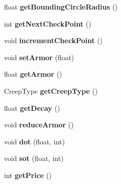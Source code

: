 \begin{DoxyCompactItemize}
\item 
\hypertarget{class_creep_a99980c4de512f87c8c23d8d191e04fba}{float {\bfseries get\+Bounding\+Circle\+Radius} ()}\label{class_creep_a99980c4de512f87c8c23d8d191e04fba}

\item 
\hypertarget{class_creep_a939ad94e5db0d29d415016140f979d1e}{int {\bfseries get\+Next\+Check\+Point} ()}\label{class_creep_a939ad94e5db0d29d415016140f979d1e}

\item 
\hypertarget{class_creep_aad1c80b9532d30acd91ed323cbec1d91}{void {\bfseries increment\+Check\+Point} ()}\label{class_creep_aad1c80b9532d30acd91ed323cbec1d91}

\item 
\hypertarget{class_creep_a0ca14be49294847889441499def1c2e3}{void {\bfseries set\+Armor} (float)}\label{class_creep_a0ca14be49294847889441499def1c2e3}

\item 
\hypertarget{class_creep_a4bb94169c7d7a24869df652df0eac2d8}{float {\bfseries get\+Armor} ()}\label{class_creep_a4bb94169c7d7a24869df652df0eac2d8}

\item 
\hypertarget{class_creep_a5b680d371d1d31242b1fdfd75cc838c9}{Creep\+Type {\bfseries get\+Creep\+Type} ()}\label{class_creep_a5b680d371d1d31242b1fdfd75cc838c9}

\item 
\hypertarget{class_creep_a098963faa59abc5e9cc43a4312f2de37}{float {\bfseries get\+Decay} ()}\label{class_creep_a098963faa59abc5e9cc43a4312f2de37}

\item 
\hypertarget{class_creep_af5ec1c42264e2f00ab1611983a53c919}{void {\bfseries reduce\+Armor} ()}\label{class_creep_af5ec1c42264e2f00ab1611983a53c919}

\item 
\hypertarget{class_creep_a0a57fbb1a206048851d981d608b52c76}{void {\bfseries dot} (float, int)}\label{class_creep_a0a57fbb1a206048851d981d608b52c76}

\item 
\hypertarget{class_creep_a4b968fb648257872db9f5dfbbdcd0d21}{void {\bfseries sot} (float, int)}\label{class_creep_a4b968fb648257872db9f5dfbbdcd0d21}

\item 
\hypertarget{class_creep_a2f2ee4afb8c9dee957d1889e31447236}{int {\bfseries get\+Price} ()}\label{class_creep_a2f2ee4afb8c9dee957d1889e31447236}


\end{DoxyCompactItemize}
